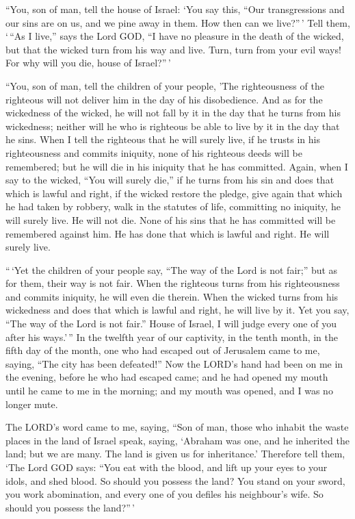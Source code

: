  ``You, son of man, tell the house of Israel: `You say
this, ``Our transgressions and our sins are on us, and we pine away in
them. How then can we live?''\,'  Tell them, `\,``As I
live,'' says the Lord GOD, ``I have no pleasure in the death of the
wicked, but that the wicked turn from his way and live. Turn, turn from
your evil ways! For why will you die, house of Israel?''\,'

 ``You, son of man, tell the children of your people,
'The righteousness of the righteous will not deliver him in the day of
his disobedience. And as for the wickedness of the wicked, he will not
fall by it in the day that he turns from his wickedness; neither will he
who is righteous be able to live by it in the day that he sins.
 When I tell the righteous that he will surely live, if
he trusts in his righteousness and commits iniquity, none of his
righteous deeds will be remembered; but he will die in his iniquity that
he has committed.  Again, when I say to the wicked, ``You
will surely die,'' if he turns from his sin and does that which is
lawful and right,  if the wicked restore the pledge, give
again that which he had taken by robbery, walk in the statutes of life,
committing no iniquity, he will surely live. He will not die.
 None of his sins that he has committed will be
remembered against him. He has done that which is lawful and right. He
will surely live.

 ``\,`Yet the children of your people say, ``The way of
the Lord is not fair;'' but as for them, their way is not fair.
 When the righteous turns from his righteousness and
commits iniquity, he will even die therein.  When the
wicked turns from his wickedness and does that which is lawful and
right, he will live by it.  Yet you say, ``The way of the
Lord is not fair.'' House of Israel, I will judge every one of you after
his ways.'\,''  In the twelfth year of our captivity, in
the tenth month, in the fifth day of the month, one who had escaped out
of Jerusalem came to me, saying, ``The city has been defeated!''
 Now the LORD's hand had been on me in the evening,
before he who had escaped came; and he had opened my mouth until he came
to me in the morning; and my mouth was opened, and I was no longer mute.

 The LORD's word came to me, saying, 
``Son of man, those who inhabit the waste places in the land of Israel
speak, saying, `Abraham was one, and he inherited the land; but we are
many. The land is given us for inheritance.'  Therefore
tell them, `The Lord GOD says: ``You eat with the blood, and lift up
your eyes to your idols, and shed blood. So should you possess the land?
 You stand on your sword, you work abomination, and every
one of you defiles his neighbour's wife. So should you possess the
land?''\,'

